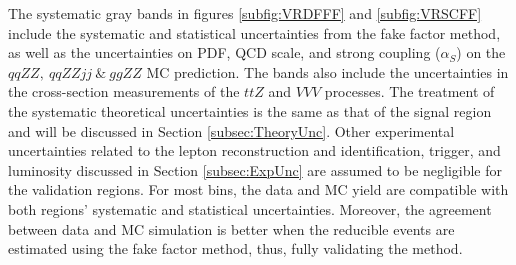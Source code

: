 The systematic gray bands in figures \ref{subfig:VRDFFF} and \ref{subfig:VRSCFF} include the systematic and statistical uncertainties from the fake factor method, as well as the uncertainties on PDF, QCD scale, and strong coupling ($\alpha_{S}$) on the $qqZZ,~qqZZjj~\&~ggZZ$ MC prediction. The bands also include the uncertainties in the cross-section measurements of the $ttZ$ and $VVV$ processes. The treatment of the systematic theoretical uncertainties is the same as that of the signal region and will be discussed in Section \ref{subsec:TheoryUnc}. Other experimental uncertainties related to the lepton reconstruction and identification, trigger, and luminosity discussed in Section \ref{subsec:ExpUnc} are assumed to be negligible for the validation regions. For most bins, the data and MC yield are compatible with both regions' systematic and statistical uncertainties. Moreover, the agreement between data and MC simulation is better when the reducible events are estimated using the fake factor method, thus, fully validating the method.

